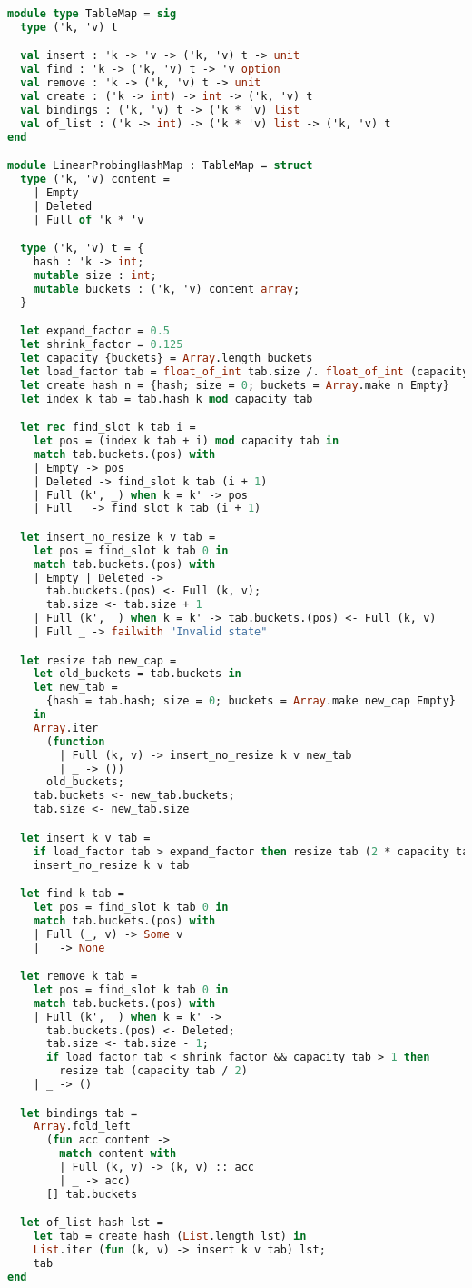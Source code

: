 \begin{lstlisting}[language=OCaml]
module type TableMap = sig
  type ('k, 'v) t

  val insert : 'k -> 'v -> ('k, 'v) t -> unit
  val find : 'k -> ('k, 'v) t -> 'v option
  val remove : 'k -> ('k, 'v) t -> unit
  val create : ('k -> int) -> int -> ('k, 'v) t
  val bindings : ('k, 'v) t -> ('k * 'v) list
  val of_list : ('k -> int) -> ('k * 'v) list -> ('k, 'v) t
end

module LinearProbingHashMap : TableMap = struct
  type ('k, 'v) content =
    | Empty
    | Deleted
    | Full of 'k * 'v

  type ('k, 'v) t = {
    hash : 'k -> int;
    mutable size : int;
    mutable buckets : ('k, 'v) content array;
  }

  let expand_factor = 0.5
  let shrink_factor = 0.125
  let capacity {buckets} = Array.length buckets
  let load_factor tab = float_of_int tab.size /. float_of_int (capacity tab)
  let create hash n = {hash; size = 0; buckets = Array.make n Empty}
  let index k tab = tab.hash k mod capacity tab

  let rec find_slot k tab i =
    let pos = (index k tab + i) mod capacity tab in
    match tab.buckets.(pos) with
    | Empty -> pos
    | Deleted -> find_slot k tab (i + 1)
    | Full (k', _) when k = k' -> pos
    | Full _ -> find_slot k tab (i + 1)

  let insert_no_resize k v tab =
    let pos = find_slot k tab 0 in
    match tab.buckets.(pos) with
    | Empty | Deleted ->
      tab.buckets.(pos) <- Full (k, v);
      tab.size <- tab.size + 1
    | Full (k', _) when k = k' -> tab.buckets.(pos) <- Full (k, v)
    | Full _ -> failwith "Invalid state"

  let resize tab new_cap =
    let old_buckets = tab.buckets in
    let new_tab =
      {hash = tab.hash; size = 0; buckets = Array.make new_cap Empty}
    in
    Array.iter
      (function
        | Full (k, v) -> insert_no_resize k v new_tab
        | _ -> ())
      old_buckets;
    tab.buckets <- new_tab.buckets;
    tab.size <- new_tab.size

  let insert k v tab =
    if load_factor tab > expand_factor then resize tab (2 * capacity tab);
    insert_no_resize k v tab

  let find k tab =
    let pos = find_slot k tab 0 in
    match tab.buckets.(pos) with
    | Full (_, v) -> Some v
    | _ -> None

  let remove k tab =
    let pos = find_slot k tab 0 in
    match tab.buckets.(pos) with
    | Full (k', _) when k = k' ->
      tab.buckets.(pos) <- Deleted;
      tab.size <- tab.size - 1;
      if load_factor tab < shrink_factor && capacity tab > 1 then
        resize tab (capacity tab / 2)
    | _ -> ()

  let bindings tab =
    Array.fold_left
      (fun acc content ->
        match content with
        | Full (k, v) -> (k, v) :: acc
        | _ -> acc)
      [] tab.buckets

  let of_list hash lst =
    let tab = create hash (List.length lst) in
    List.iter (fun (k, v) -> insert k v tab) lst;
    tab
end
\end{lstlisting}


